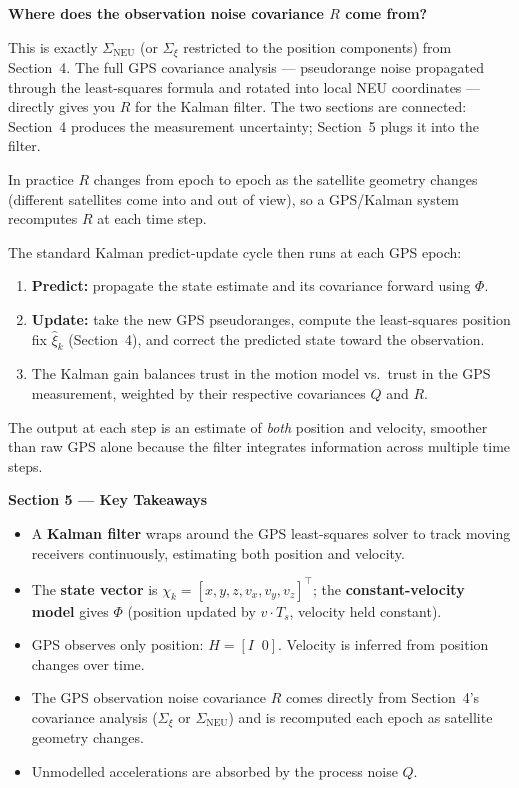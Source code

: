 \documentclass[12pt, a4paper]{article}
\begin{document}
\begin{notebox}
  \textbf{Where does the observation noise covariance $R$ come from?}

  This is exactly $\Sigma_\text{NEU}$ (or $\Sigma_\xi$ restricted to the
  position components) from Section~4.
  The full GPS covariance analysis --- pseudorange noise propagated through
  the least-squares formula and rotated into local NEU coordinates ---
  directly gives you $R$ for the Kalman filter.
  The two sections are connected: Section~4 produces the measurement
  uncertainty; Section~5 plugs it into the filter.

  In practice $R$ changes from epoch to epoch as the satellite geometry
  changes (different satellites come into and out of view), so a GPS/Kalman
  system recomputes $R$ at each time step.
\end{notebox}

The standard Kalman predict-update cycle then runs at each GPS epoch:
\begin{enumerate}[leftmargin=1.5em, itemsep=3pt]
  \item \textbf{Predict:} propagate the state estimate and its covariance
    forward using $\Phi$.
  \item \textbf{Update:} take the new GPS pseudoranges, compute the
    least-squares position fix $\hat{\xi}_k$ (Section~4), and correct the
    predicted state toward the observation.
  \item The Kalman gain balances trust in the motion model vs.\ trust in
    the GPS measurement, weighted by their respective covariances $Q$
    and $R$.
\end{enumerate}

The output at each step is an estimate of \emph{both} position and
velocity, smoother than raw GPS alone because the filter integrates
information across multiple time steps.

\begin{keybox}
  \textbf{Section 5 --- Key Takeaways}
  \begin{itemize}[leftmargin=1.2em,itemsep=2pt]
    \item A \textbf{Kalman filter} wraps around the GPS least-squares
      solver to track moving receivers continuously, estimating both
      position and velocity.
    \item The \textbf{state vector} is
      $\chi_k = [x,y,z,v_x,v_y,v_z]^\top$;
      the \textbf{constant-velocity model} gives $\Phi$ (position updated
      by $v \cdot T_s$, velocity held constant).
    \item GPS observes only position: $H = [I\;\; 0]$.
      Velocity is inferred from position changes over time.
    \item The GPS observation noise covariance $R$ comes directly from
      Section~4's covariance analysis ($\Sigma_\xi$ or $\Sigma_\text{NEU}$)
      and is recomputed each epoch as satellite geometry changes.
    \item Unmodelled accelerations are absorbed by the process noise $Q$.
  \end{itemize}
\end{keybox}
\end{document}

